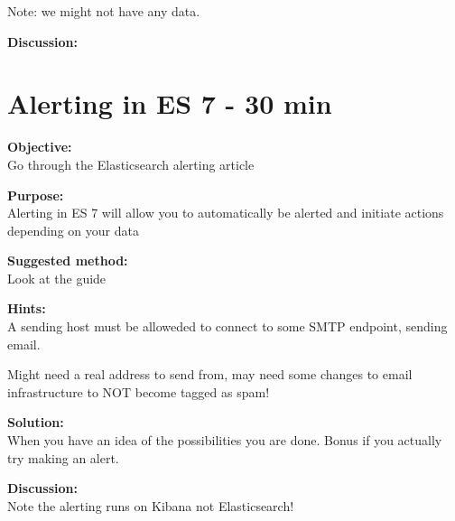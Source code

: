 \documentclass[a4paper,11pt,notitlepage]{report}
\begin{document}
Note: we might not have any data.

{\bf Discussion:}\\




\chapter{Alerting in ES 7 - 30 min}
\label{ex:es7-alerting}


{\bf Objective:}\\
Go through the Elasticsearch alerting article

{\bf Purpose:}\\
Alerting in ES 7 will allow you to automatically be alerted and initiate actions depending on your data


{\bf Suggested method:}\\
Look at the guide



{\bf Hints:}\\
A sending host must be alloweded to connect to some SMTP endpoint, sending email.

Might need a real address to send from, may need some changes to email infrastructure to NOT become tagged as spam!



{\bf Solution:}\\
When you have an idea of the possibilities you are done. Bonus if you actually try making an alert.

{\bf Discussion:}\\
Note the alerting runs on Kibana not Elasticsearch!
\end{document}
